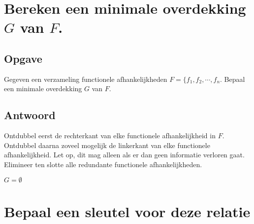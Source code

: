 \documentclass[normaalvormen.tex]{subfiles}
\begin{document}
\section{Bereken een minimale overdekking $G$ van $F$.}
\subsection*{Opgave}
Gegeven een verzameling functionele afhankelijkheden $F= \{f_1,f_2,\cdots,f_n$. Bepaal een minimale overdekking $G$ van $F$.
\subsection*{Antwoord}
Ontdubbel eerst de rechterkant van elke functionele afhankelijkheid in $F$. Ontdubbel daarna zoveel mogelijk de linkerkant van elke functionele afhankelijkheid. Let op, dit mag alleen als er dan geen informatie verloren gaat. Elimineer ten slotte alle redundante functionele afhankelijkheden.

\begin{mdframed}
\begin{algorithm}[H]
$G = \emptyset$\\

\end{algorithm}
\end{mdframed}

\section{Bepaal een sleutel voor deze relatie}
\end{document}
